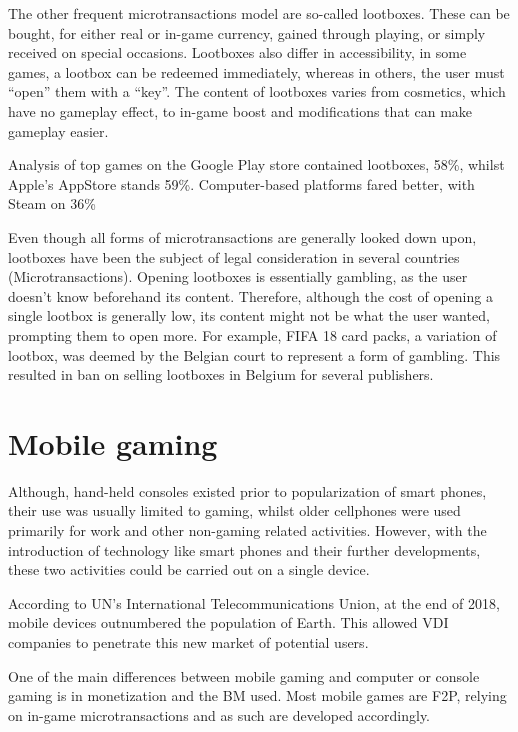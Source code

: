 \documentclass[10pt,british,a4paper,titlepage]{article}
\begin{document}
The other frequent microtransactions model are so-called lootboxes. These can be bought, for either real or in-game currency, gained through playing, or simply received on special occasions. Lootboxes also differ in accessibility, in some games, a lootbox can be redeemed immediately, whereas in others, the user must “open” them with a “key”. The content of lootboxes varies from cosmetics, which have no gameplay effect, to in-game boost and modifications that can make gameplay easier. 

Analysis of top games on the Google Play store contained lootboxes, 58\%, whilst Apple's AppStore stands 59\%. Computer-based platforms fared better, with Steam on 36\%

Even though all forms of microtransactions are generally looked down upon, lootboxes have been the subject of legal consideration in several countries (Microtransactions). Opening lootboxes is essentially gambling, as the user doesn’t know beforehand its content. Therefore, although the cost of opening a single lootbox is generally low, its content might not be what the user wanted, prompting them to open more. For example, FIFA 18 card packs, a variation of lootbox, was deemed by the Belgian court to represent a form of gambling. This resulted in ban on selling lootboxes in Belgium for several publishers\cite{tomic2018economic:micro}.




\section{Mobile gaming} 


Although, hand-held consoles existed prior to popularization of smart phones, their use was usually limited to gaming, whilst older cellphones were used primarily for work and other non-gaming related activities. However, with the introduction of technology like smart phones and their further developments, these two activities could be carried out on a single device. 

According to UN's International Telecommunications Union, at the end of 2018, mobile devices outnumbered the population of Earth. This allowed VDI companies to penetrate this new market of potential users\cite{mayra2020mobile:mob}.   

One of the main differences between mobile gaming and computer or console gaming is in monetization and the BM used. Most mobile games are F2P, relying on in-game microtransactions and as such are developed accordingly.
\end{document}

